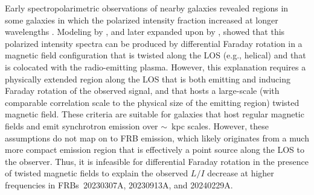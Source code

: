 \documentclass[twocolumn, linenumbers]{aastex701}
\begin{document}
Early spectropolarimetric observations of nearby galaxies revealed regions in some galaxies in which the polarized intensity fraction increased at longer wavelengths \citep[e.g., in L-band observations of NGC~6946 and M51, respectively;][]{1991A&A...251...15B, 1992A&A...265..417H}. Modeling by \cite{1998MNRAS.299..189S}, and later expanded upon by \cite{2014MNRAS.441.2049H}, showed that this polarized intensity spectra can be produced by differential Faraday rotation in a magnetic field configuration that is twisted along the LOS (e.g., helical) and that is colocated with the radio-emitting plasma. However, this explanation requires a physically extended region along the LOS that is both emitting and inducing Faraday rotation of the observed signal, and that hosts a large-scale (with comparable correlation scale to the physical size of the emitting region) twisted magnetic field. These criteria are suitable for galaxies that host regular magnetic fields and emit synchrotron emission over $\sim$~kpc scales. However, these assumptions do not map on to FRB emission, which likely originates from a much more compact emission region that is effectively a point source along the LOS to the observer. Thus, it is infeasible for differential Faraday rotation in the presence of twisted magnetic fields to explain the observed $L/I$ decrease at higher frequencies in FRBs~20230307A, 20230913A, and 20240229A.
\end{document}
